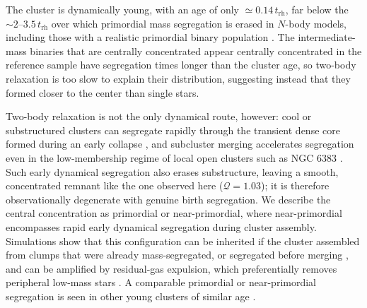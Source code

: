 \documentclass{aa}
\providecommand{\DIFaddtex}[1]{{\protect\color[rgb]{0,0,0.7}#1}} %
\providecommand{\DIFdeltex}[1]{{\protect\color[rgb]{0.65,0,0}\footnotesize #1}} %
\providecommand{\DIFaddbegin}{} %
\providecommand{\DIFaddend}{} %
\providecommand{\DIFdelbegin}{} %
\providecommand{\DIFdelend}{} %
\providecommand{\DIFadd}[1]{\texorpdfstring{\DIFaddtex{#1}}{#1}} %
\providecommand{\DIFdel}[1]{\texorpdfstring{\DIFdeltex{#1}}{}} %
\providecommand{\DIFscaledelfig}{0.5}
\newlength{\DIFdelgraphicswidth} %
\newlength{\DIFdelgraphicsheight} %
\providecommand{\DIFaddincludegraphics}[2][]{{\color{blue}\fbox{\DIFOincludegraphics[#1]{#2}}}} %
\providecommand{\DIFdelincludegraphics}[2][]{%
\sbox{\DIFdelgraphicsbox}{\DIFOincludegraphics[#1]{#2}}%
\settoboxwidth{\DIFdelgraphicswidth}{\DIFdelgraphicsbox} %
\settoboxtotalheight{\DIFdelgraphicsheight}{\DIFdelgraphicsbox} %
\scalebox{\DIFscaledelfig}{%
\parbox[b]{\DIFdelgraphicswidth}{\usebox{\DIFdelgraphicsbox}\\[-\baselineskip] \rule{\DIFdelgraphicswidth}{0em}}\llap{\resizebox{\DIFdelgraphicswidth}{\DIFdelgraphicsheight}{%
\setlength{\unitlength}{\DIFdelgraphicswidth}%
\begin{picture}(1,1)%
\thicklines\linethickness{2pt} %
{\color[rgb]{1,0,0}\put(0,0){\framebox(1,1){}}}%
{\color[rgb]{1,0,0}\put(0,0){\line( 1,1){1}}}%
{\color[rgb]{1,0,0}\put(0,1){\line(1,-1){1}}}%
\end{picture}%
}\hspace*{3pt}}} %
} %
\DeclareRobustCommand{\DIFaddbegin}{\DIFOaddbegin \let\includegraphics\DIFaddincludegraphics} %
\DeclareRobustCommand{\DIFaddend}{\DIFOaddend \let\includegraphics\DIFOincludegraphics} %
\DeclareRobustCommand{\DIFdelbegin}{\DIFOdelbegin \let\includegraphics\DIFdelincludegraphics} %
\DeclareRobustCommand{\DIFdelend}{\DIFOaddend \let\includegraphics\DIFOincludegraphics} %
\begin{document}
The cluster is dynamically young, with an age of only $\simeq0.14\,t_{\mathrm{rh}}$, far below the $\sim2$--$3.5\,t_{\mathrm{rh}}$ over which primordial mass segregation is erased in $N$-body models, including those with a realistic primordial binary population \citep{2020A&A...638A.155P}. The intermediate-mass binaries that \DIFdelbegin \DIFdel{are centrally concentrated }\DIFdelend \DIFaddbegin \DIFadd{appear centrally concentrated in the reference sample }\DIFaddend have segregation times longer than the cluster age, so two-body relaxation is too slow to explain their distribution, suggesting instead that they formed closer to the center than single stars.

Two-body relaxation is not the only dynamical route, however: cool or substructured clusters can segregate rapidly through the transient dense core formed during an early collapse \citep{2009ApJ...700L..99A}, and subcluster merging accelerates segregation even in the low-membership regime of local open clusters such as NGC 6383 \citep{2009MNRAS.400..657M}. Such early dynamical segregation also erases substructure, leaving a smooth, concentrated remnant like the one observed here ($\mathcal{Q}=1.03$); it is therefore observationally degenerate with genuine birth segregation. We describe the central concentration as primordial or near-primordial, where near-primordial encompasses rapid early dynamical segregation during cluster assembly. Simulations show that this configuration can be inherited if the cluster assembled from clumps that were already mass-segregated, or segregated before merging \citep{2007ApJ...655L..45M}, and can be amplified by residual-gas expulsion, which preferentially removes peripheral low-mass stars \citep{2007MNRAS.380.1589B}. A comparable primordial or near-primordial segregation is seen in other young clusters of similar age \citep{2007AJ....134.1368C,2008AJ....135..173S}.
\end{document}
